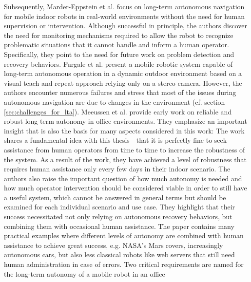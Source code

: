 \documentclass[english, master, utf8]{base/thesis_KBS}
\begin{document}
Subsequently, Marder-Eppstein et al. \cite{MarderEppstein:2010} focus on long-term autonomous navigation for mobile indoor
robots in real-world environments without the need for human supervision or intervention. Although successful in principle, the authors discover the need for monitoring mechanisms
required to allow the robot to recognize problematic situations that it cannot handle and inform a human operator. Specifically, they point to the need for future work on problem
detection and recovery behaviors.\newline
Furgale et al. \cite{Furgale:2010} present a mobile robotic system capable of long-term autonomous operation in a dynamic outdoor environment based on a visual teach-and-repeat
approach relying only on a stereo camera. However, the authors encounter numerous failures and stress that most of the issues during autonomous navigation are due to changes in the
environment (cf. section \ref{sec:challenges_for_lta}).\newline
Meeussen et al. \cite{Meeussen:2011} provide early work on reliable and robust long-term autonomy in office environments. They emphasize an important insight that is also the basis
for many aspects considered in this work:  \cite{Meeussen:2011} The work shares a fundamental idea with this thesis - that it is perfectly
fine to seek assistance from human operators from time to time to increase the robustness of the system. As a result of the work, they have achieved a level of robustness that
requires human assistance only every few days in their indoor scenario. The authors also raise the important question of how much autonomy is needed and how much operator intervention
should be considered viable in order to still have a useful system, which cannot be answered in general terms but should be examined for each individual scenario and use case. They
highlight that their success necessitated not only relying on autonomous recovery behaviors, but combining them with occasional human assistance. The paper contains many practical
examples where different levels of autonomy are combined with human assistance to achieve great success, e.g. NASA's Mars rovers, increasingly autonomous cars, but also less classical
robots like web servers that still need human administration in case of errors. Two critical requirements are named for the long-term autonomy of a mobile robot in an office
\end{document}
